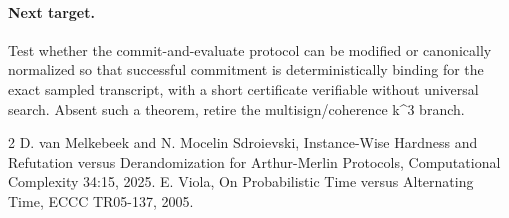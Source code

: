 \documentclass[11pt]{article}
\begin{document}
\paragraph{Next target.}
Test whether the commit-and-evaluate protocol can be modified or canonically normalized so that successful commitment is deterministically binding for the exact sampled transcript, with a short certificate verifiable without universal search. Absent such a theorem, retire the multisign/coherence k^3 branch.

\begin{thebibliography}{2}
 D. van Melkebeek and N. Mocelin Sdroievski, Instance-Wise Hardness and Refutation versus Derandomization for Arthur-Merlin Protocols, Computational Complexity 34:15, 2025.
 E. Viola, On Probabilistic Time versus Alternating Time, ECCC TR05-137, 2005.
\end{thebibliography}
\end{document}
